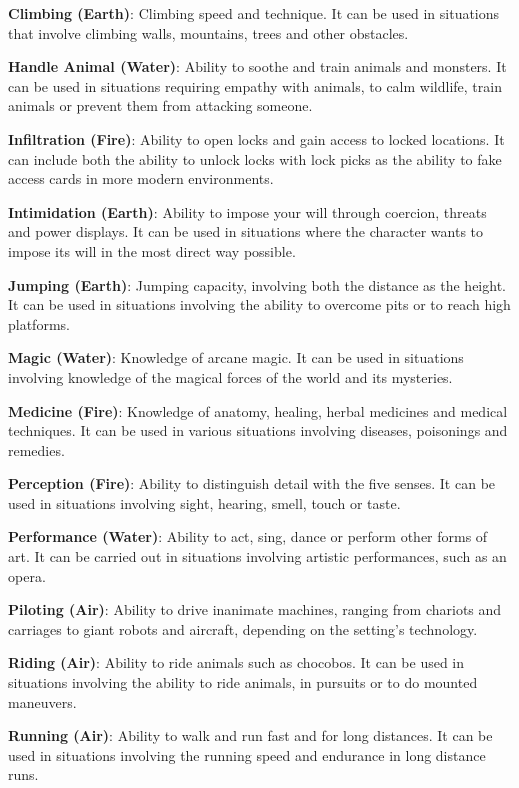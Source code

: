\begin{multicols}{2}
\textbf{Climbing (Earth)}: Climbing speed and
technique. It can be used in situations that involve
climbing walls, mountains, trees and other
obstacles.

\textbf{Handle Animal (Water)}: Ability to soothe
and train animals and monsters. It can be used in
situations requiring empathy with animals, to
calm wildlife, train animals or prevent them from
attacking someone.

\textbf{Infiltration (Fire)}: Ability to open locks
and gain access to locked locations. It can include
both the ability to unlock locks with lock picks as
the ability to fake access cards in more modern
environments.

\textbf{Intimidation (Earth)}: Ability to impose
your will through coercion, threats and power
displays. It can be used in situations where the
character wants to impose its will in the most
direct way possible.

\textbf{Jumping (Earth)}: Jumping capacity,
involving both the distance as the height. It can be
used in situations involving the ability to
overcome pits or to reach high platforms.

\textbf{Magic (Water)}: Knowledge of arcane
magic. It can be used in situations involving
knowledge of the magical forces of the world and
its mysteries.

\textbf{Medicine (Fire)}: Knowledge of anatomy,
healing, herbal medicines and medical techniques.
It can be used in various situations involving
diseases, poisonings and remedies.

\textbf{Perception (Fire)}:
Ability to distinguish detail
with the five senses. It can be
used in situations involving
sight, hearing, smell, touch or
taste.

\textbf{Performance (Water)}:
Ability to act, sing,
dance or perform other
forms of art. It can be carried
out in situations involving
artistic performances, such
as an opera.

\textbf{Piloting (Air)}: Ability to drive inanimate
machines, ranging from chariots and carriages to
giant robots and aircraft, depending on the
setting’s technology.

\textbf{Riding (Air)}: Ability to ride animals such
as chocobos. It can be used in situations involving
the ability to ride animals, in pursuits or to do
mounted maneuvers.

\textbf{Running (Air)}: Ability to walk and run fast
and for long distances. It can be used in situations
involving the running speed and endurance in long
distance runs.


\end{multicols}
